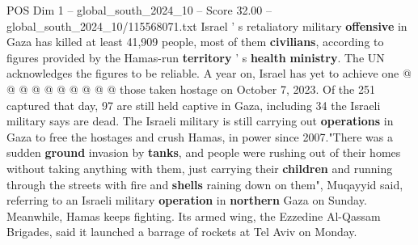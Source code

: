 \begin{textsample}{POS Dim 1 – global\_south\_2024\_10 – Score 32.00 – global\_south\_2024\_10/115568071.txt}
Israel ' s retaliatory military \textbf{offensive} in Gaza has killed at least 41,909 people, most of them \textbf{civilians}, according to figures provided by the Hamas-run \textbf{territory} ' s \textbf{health} \textbf{ministry}.
The UN acknowledges the figures to be reliable.
A year on, Israel has yet to achieve one @ @ @ @ @ @ @ @ @ @ those taken hostage on October 7, 2023.
Of the 251 captured that day, 97 are still held captive in Gaza, including 34 the Israeli military says are dead.
The Israeli military is still carrying out \textbf{operations} in Gaza to free the hostages and crush Hamas, in power since 2007."There was a sudden \textbf{ground} invasion by \textbf{tanks}, and people were rushing out of their homes without taking anything with them, just carrying their \textbf{children} and running through the streets with fire and \textbf{shells} raining down on them", Muqayyid said, referring to an Israeli military \textbf{operation} in \textbf{northern} Gaza on Sunday.
Meanwhile, Hamas keeps fighting.
Its armed wing, the Ezzedine Al-Qassam Brigades, said it launched a barrage of rockets at Tel Aviv on Monday.

\end{textsample}
